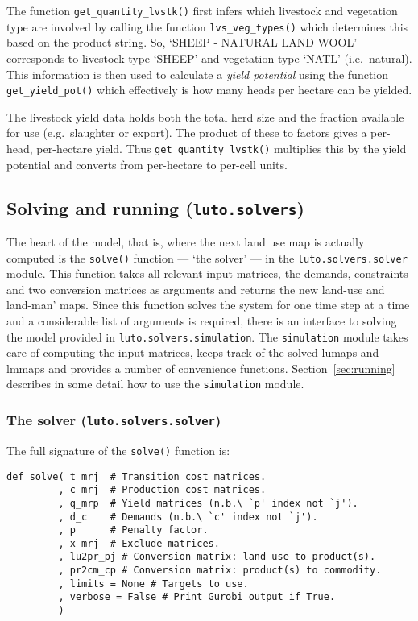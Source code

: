 \documentclass[12pt,a4paper,twoside]{article}
\begin{document}
The function \texttt{get_quantity_lvstk()} first infers which livestock and vegetation type are involved by calling the function \texttt{lvs_veg_types()} which determines this based on the product string. So, `SHEEP - NATURAL LAND WOOL' corresponds to livestock type `SHEEP' and vegetation type `NATL' (i.e.\ natural). This information is then used to calculate a \emph{yield potential} using the function \texttt{get_yield_pot()} which effectively is how many heads per hectare can be yielded.

The livestock yield data holds both the total herd size and the fraction available for use (e.g.\ slaughter or export). The product of these to factors gives a per-head, per-hectare yield. Thus \texttt{get_quantity_lvstk()} multiplies this by the yield potential and converts from per-hectare to per-cell units.

\subsection{Solving and running (\texttt{luto.solvers})}\label{subsec:solvers}

The heart of the model, that is, where the next land use map is actually computed is the \texttt{solve()} function --- `the solver' --- in the \texttt{luto.solvers.solver} module. This function takes all relevant input matrices, the demands, constraints and two conversion matrices as arguments and returns the new land-use and land-man' maps. Since this function solves the system for one time step at a time and a considerable list of arguments is required, there is an interface to solving the model provided in \texttt{luto.solvers.simulation}. The \texttt{simulation} module takes care of computing the input matrices, keeps track of the solved lumaps and lmmaps and provides a number of convenience functions. Section~\ref{sec:running} describes in some detail how to use the \texttt{simulation} module.

\subsubsection{The solver (\texttt{luto.solvers.solver})}

The full signature of the \texttt{solve()} function is:

\begin{verbatim}
def solve( t_mrj  # Transition cost matrices.
         , c_mrj  # Production cost matrices.
         , q_mrp  # Yield matrices (n.b.\ `p' index not `j').
         , d_c    # Demands (n.b.\ `c' index not `j').
         , p      # Penalty factor.
         , x_mrj  # Exclude matrices.
         , lu2pr_pj # Conversion matrix: land-use to product(s).
         , pr2cm_cp # Conversion matrix: product(s) to commodity.
         , limits = None # Targets to use.
         , verbose = False # Print Gurobi output if True.
         )
\end{verbatim}
\end{document}
